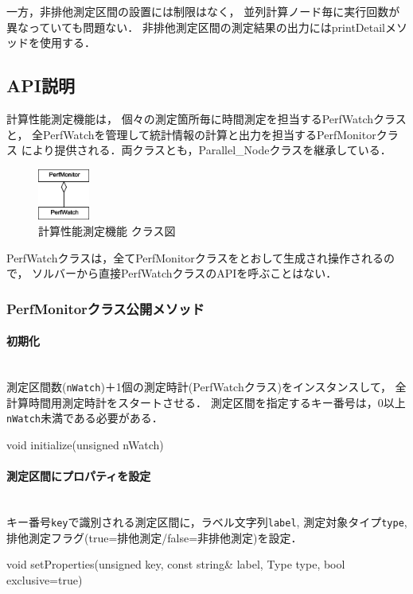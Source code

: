 一方，非排他測定区間の設置には制限はなく，
並列計算ノード毎に実行回数が異なっていても問題ない．
非排他測定区間の測定結果の出力にはprintDetailメソッドを使用する．

%
\subsection{API説明}
計算性能測定機能は，
個々の測定箇所毎に時間測定を担当するPerfWatchクラスと，
全PerfWatchを管理して統計情報の計算と出力を担当するPerfMonitorクラス
により提供される．両クラスとも，Parallel\_Nodeクラスを継承している．
\begin{figure}[H]
\vspace{0.5cm}
\begin{center}
\includegraphics[width=0.15\textwidth]{PerfMonitor.eps}
\caption{計算性能測定機能 クラス図}
\label{fig:timing}
\end{center}
\end{figure}

PerfWatchクラスは，全てPerfMonitorクラスをとおして生成され操作されるので，
ソルバーから直接PerfWatchクラスのAPIを呼ぶことはない．

%
\subsubsection{PerfMonitorクラス公開メソッド}
\paragraph{初期化}\mbox{}\\
測定区間数({\tt nWatch})＋1個の測定時計(PerfWatchクラス)をインスタンスして，
全計算時間用測定時計をスタートさせる．
測定区間を指定するキー番号は，0以上{\tt nWatch}未満である必要がある．
{\small
\begin{program}
void initialize(unsigned nWatch)
\end{program}
}

\paragraph{測定区間にプロパティを設定}\mbox{}\\
キー番号{\tt key}で識別される測定区間に，ラベル文字列{\tt label},
測定対象タイプ{\tt type}, 排他測定フラグ(true=排他測定/false=非排他測定)を設定．
{\small
\begin{program}
void setProperties(unsigned key, const string& label, Type type,
                   bool exclusive=true)
\end{program}
}

